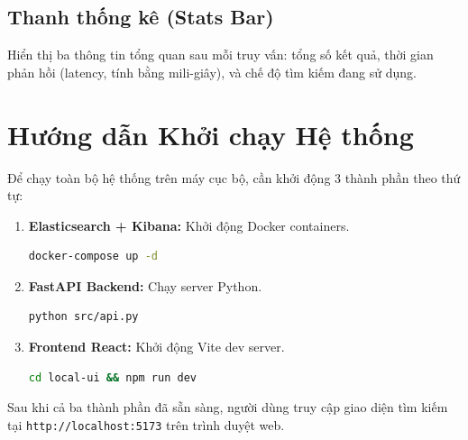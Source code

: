 \subsection{Thanh thống kê (Stats Bar)}
Hiển thị ba thông tin tổng quan sau mỗi truy vấn: tổng số kết quả, thời gian phản hồi (latency, tính bằng mili-giây), và chế độ tìm kiếm đang sử dụng.

\section{Hướng dẫn Khởi chạy Hệ thống}
Để chạy toàn bộ hệ thống trên máy cục bộ, cần khởi động 3 thành phần theo thứ tự:

\begin{enumerate}
    \item \textbf{Elasticsearch + Kibana:} Khởi động Docker containers.
    \begin{lstlisting}[language=bash]
docker-compose up -d
    \end{lstlisting}
    \item \textbf{FastAPI Backend:} Chạy server Python.
    \begin{lstlisting}[language=bash]
python src/api.py
    \end{lstlisting}
    \item \textbf{Frontend React:} Khởi động Vite dev server.
    \begin{lstlisting}[language=bash]
cd local-ui && npm run dev
    \end{lstlisting}
\end{enumerate}

Sau khi cả ba thành phần đã sẵn sàng, người dùng truy cập giao diện tìm kiếm tại \texttt{http://localhost:5173} trên trình duyệt web.
